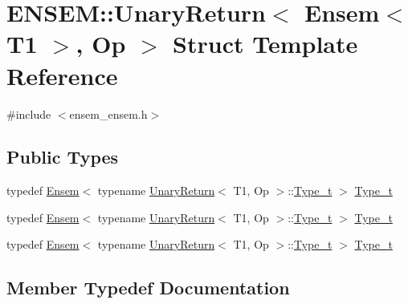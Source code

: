 \hypertarget{structENSEM_1_1UnaryReturn_3_01Ensem_3_01T1_01_4_00_01Op_01_4}{}\section{E\+N\+S\+EM\+:\+:Unary\+Return$<$ Ensem$<$ T1 $>$, Op $>$ Struct Template Reference}
\label{structENSEM_1_1UnaryReturn_3_01Ensem_3_01T1_01_4_00_01Op_01_4}


{\ttfamily \#include $<$ensem\+\_\+ensem.\+h$>$}

\subsection*{Public Types}
\begin{DoxyCompactItemize}
\item 
typedef \mbox{\hyperlink{classENSEM_1_1Ensem}{Ensem}}$<$ typename \mbox{\hyperlink{structENSEM_1_1UnaryReturn}{Unary\+Return}}$<$ T1, Op $>$\+::\mbox{\hyperlink{structENSEM_1_1UnaryReturn_3_01Ensem_3_01T1_01_4_00_01Op_01_4_a224980bb4b2ff570eb5fcf4036421962}{Type\+\_\+t}} $>$ \mbox{\hyperlink{structENSEM_1_1UnaryReturn_3_01Ensem_3_01T1_01_4_00_01Op_01_4_a224980bb4b2ff570eb5fcf4036421962}{Type\+\_\+t}}
\item 
typedef \mbox{\hyperlink{classENSEM_1_1Ensem}{Ensem}}$<$ typename \mbox{\hyperlink{structENSEM_1_1UnaryReturn}{Unary\+Return}}$<$ T1, Op $>$\+::\mbox{\hyperlink{structENSEM_1_1UnaryReturn_3_01Ensem_3_01T1_01_4_00_01Op_01_4_a224980bb4b2ff570eb5fcf4036421962}{Type\+\_\+t}} $>$ \mbox{\hyperlink{structENSEM_1_1UnaryReturn_3_01Ensem_3_01T1_01_4_00_01Op_01_4_a224980bb4b2ff570eb5fcf4036421962}{Type\+\_\+t}}
\item 
typedef \mbox{\hyperlink{classENSEM_1_1Ensem}{Ensem}}$<$ typename \mbox{\hyperlink{structENSEM_1_1UnaryReturn}{Unary\+Return}}$<$ T1, Op $>$\+::\mbox{\hyperlink{structENSEM_1_1UnaryReturn_3_01Ensem_3_01T1_01_4_00_01Op_01_4_a224980bb4b2ff570eb5fcf4036421962}{Type\+\_\+t}} $>$ \mbox{\hyperlink{structENSEM_1_1UnaryReturn_3_01Ensem_3_01T1_01_4_00_01Op_01_4_a224980bb4b2ff570eb5fcf4036421962}{Type\+\_\+t}}
\end{DoxyCompactItemize}


\subsection{Member Typedef Documentation}
\mbox{\label{structENSEM_1_1UnaryReturn_3_01Ensem_3_01T1_01_4_00_01Op_01_4_a224980bb4b2ff570eb5fcf4036421962}} 
